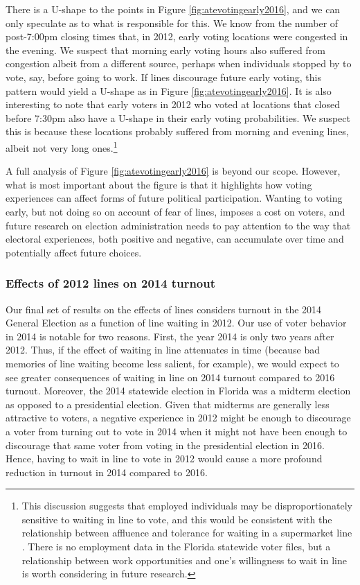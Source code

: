 \documentclass[12pt,titlepage]{article}
\begin{document}
There is a U-shape to the points in Figure
\ref{fig:atevotingearly2016}, and we can only speculate as to what is
responsible for this.  We know from the number of post-7:00pm closing
times that, in 2012, early voting locations were congested in the
evening.  We suspect that morning early voting hours also suffered
from congestion albeit from a different source, perhaps when
individuals stopped by to vote, say, before going to work.  If lines
discourage future early voting, this pattern would yield a U-shape as
in Figure \ref{fig:atevotingearly2016}.  It is also interesting to
note that early voters in 2012 who voted at locations that closed
before 7:30pm also have a U-shape in their early voting probabilities.
We suspect this is because these locations probably suffered from
morning and evening lines, albeit not very long ones.\footnote{This
  discussion suggests that employed individuals may be
  disproportionately sensitive to waiting in line to vote, and this
  would be consistent with the relationship between affluence and
  tolerance for waiting in a supermarket line
  \citep[e.g.,][]{bennett:waitinginlinechars}.  There is no employment
  data in the Florida statewide voter files, but a relationship
  between work opportunities and one's willingness to wait in line is
  worth considering in future research.}

A full analysis of Figure \ref{fig:atevotingearly2016} is beyond our
scope.  However, what is most important about the figure is that it
highlights how voting experiences can affect forms of future political
participation.  Wanting to voting early, but not doing so on account
of fear of lines, imposes a cost on voters, and future research on
election administration needs to pay attention to the way that
electoral experiences, both positive and negative, can accumulate over
time and potentially affect future choices.

\subsubsection*{Effects of 2012 lines on 2014 turnout}

Our final set of results on the effects of lines considers turnout in
the 2014 General Election as a function of line waiting in 2012.  Our
use of voter behavior in 2014 is notable for two reasons.  First,
the year 2014 is only two years after 2012.  Thus, if the
effect of waiting in line attenuates in time (because bad memories of
line waiting become less salient, for example), we would expect to see
greater consequences of waiting in line on 2014 turnout compared to
2016 turnout. Moreover, the 2014 statewide election in
Florida was a midterm election as opposed to a presidential election.  
Given that midterms are generally less attractive to voters,
a negative experience in 2012 might be enough to discourage a voter from 
turning out to vote in 2014 when it might not have been enough to discourage
that same voter from voting in the presidential election in 2016.
Hence, having to wait in line to vote in 2012 would cause a more profound reduction in turnout in 2014
compared to 2016. 
\end{document}
